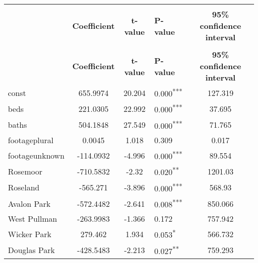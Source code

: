 \documentclass[12pt]{report}
\begin{document}
\begin{longtable}{l S[table-format=6.4] S[table-format=3.4] l S[table-format=4.4]}
	\hline \hline \\
	                             & \textbf{Coefficient} & \textbf{t-value} & \textbf{P-value}           & \textbf{95\% confidence interval} \\ \hline
	\endfirsthead
	\hline \hline \\
	                             & \textbf{Coefficient} & \textbf{t-value} & \textbf{P-value}           & \textbf{95\% confidence interval} \\ \hline
	\endhead
	const                        & 655.9974             & 20.204           & 0.000\textsuperscript{***} & 127.319                           \\
	beds                         & 221.0305             & 22.992           & 0.000\textsuperscript{***} & 37.695                            \\
	baths                        & 504.1848             & 27.549           & 0.000\textsuperscript{***} & 71.765                            \\
	footageplural                & 0.0045               & 1.018            & 0.309                      & 0.017                             \\
	footageunknown               & -114.0932            & -4.996           & 0.000\textsuperscript{***} & 89.554                            \\
	Rosemoor                     & -710.5832            & -2.32            & 0.020\textsuperscript{**}  & 1201.03                           \\
	Roseland                     & -565.271             & -3.896           & 0.000\textsuperscript{***} & 568.93                            \\
	Avalon Park                  & -572.4482            & -2.641           & 0.008\textsuperscript{***} & 850.066                           \\
	West Pullman                 & -263.9983            & -1.366           & 0.172                      & 757.942                           \\
	Wicker Park                  & 279.462              & 1.934            & 0.053\textsuperscript{*}   & 566.732                           \\
	Douglas Park                 & -428.5483            & -2.213           & 0.027\textsuperscript{**}  & 759.293                           \\

\end{longtable}
\end{document}
